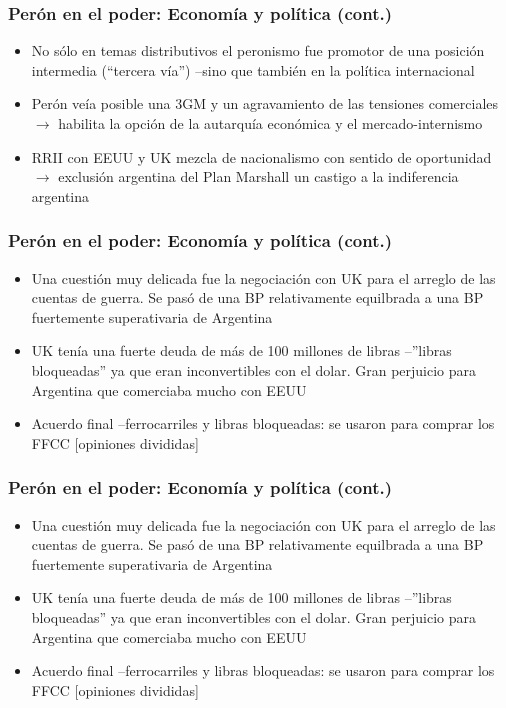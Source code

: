 \documentclass[14pt,aspectratio=169]{beamer}
\begin{document}
  \begin{frame}\frametitle{Perón en el poder: Economía y política (cont.)}
   \begin{itemize} \itemsep 10pt
   \item No sólo en temas distributivos el peronismo fue promotor de
     una posición intermedia (``tercera vía'') --sino que también en
     la política internacional
     \item Perón veía posible una 3GM y un agravamiento de las
       tensiones comerciales $\longrightarrow$ habilita la opción de
       la autarquía económica y el mercado-internismo
       \item RRII con EEUU y UK mezcla de nacionalismo con sentido de
         oportunidad $\longrightarrow$ exclusión argentina del Plan
         Marshall un castigo a la indiferencia argentina
     \end{itemize}
 \end{frame}


  \begin{frame}\frametitle{Perón en el poder: Economía y política (cont.)}
   \begin{itemize} \itemsep 10pt
   \item Una cuestión muy delicada fue la negociación con UK para el
     arreglo de las cuentas de guerra. Se pasó de una BP relativamente
     equilbrada a una BP fuertemente superativaria de Argentina
     \item UK tenía una fuerte deuda de más de 100 millones de libras
       --''libras bloqueadas'' ya que eran inconvertibles con el
       dolar. Gran perjuicio para Argentina que comerciaba mucho con EEUU
       \item Acuerdo final --ferrocarriles y libras bloqueadas: se
         usaron para comprar los FFCC [opiniones divididas]
     \end{itemize}
   \end{frame}


   \begin{frame}\frametitle{Perón en el poder: Economía y política (cont.)}
   \begin{itemize} \itemsep 10pt
   \item Una cuestión muy delicada fue la negociación con UK para el
     arreglo de las cuentas de guerra. Se pasó de una BP relativamente
     equilbrada a una BP fuertemente superativaria de Argentina
     \item UK tenía una fuerte deuda de más de 100 millones de libras
       --''libras bloqueadas'' ya que eran inconvertibles con el
       dolar. Gran perjuicio para Argentina que comerciaba mucho con EEUU
       \item Acuerdo final --ferrocarriles y libras bloqueadas: se
         usaron para comprar los FFCC [opiniones divididas]
     \end{itemize}
 \end{frame}
 
                 
\end{document}
